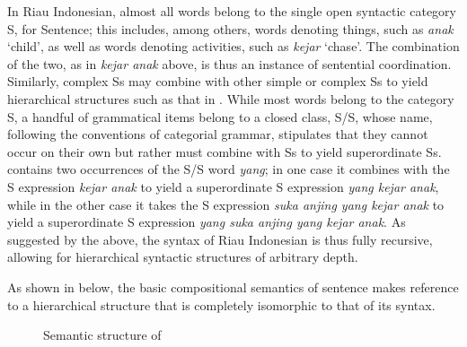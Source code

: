\documentclass[output=paper,colorlinks,citecolor=brown
]{langscibook}
\begin{document}
In Riau Indonesian, almost all words belong to the single open syntactic category S, for Sentence; this includes, among others, words denoting things, such as \textit{anak} `child', as well as words denoting activities, such as \textit{kejar} `chase'. The combination of the two, as in \textit{kejar anak} above, is thus an instance of sentential coordination. Similarly, complex Ss may combine with other simple or complex Ss to yield hierarchical structures such as that in . While most words belong to the category S, a handful of grammatical items belong to a closed class, S/S, whose name, following the conventions of categorial grammar, stipulates that they cannot occur on their own but rather must combine with Ss to yield superordinate Ss.  contains two occurrences of the S/S word \textit{yang}; in one case it combines with the S expression \textit{kejar anak} to yield a superordinate S expression \textit{yang kejar anak}, while in the other case it takes the S expression \textit{suka anjing yang kejar anak} to yield a superordinate S expression \textit{yang suka anjing yang kejar anak}. As suggested by the above, the syntax of Riau Indonesian is thus fully recursive, allowing for hierarchical syntactic structures of arbitrary depth.

As shown in  below, the basic compositional semantics of sentence  makes reference to a hierarchical structure that is completely isomorphic to that of its syntax.

\begin{figure}
\caption{\label{fig:gil:fig2}Semantic structure of }
\end{figure}
\end{document}
